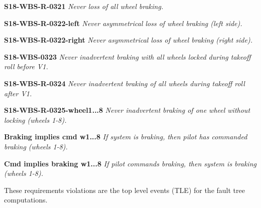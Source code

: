 \textbf{S18-WBS-R-0321} \textit{Never loss of all wheel braking.}

\textbf{S18-WBS-R-0322-left} \textit{Never asymmetrical loss of wheel braking (left side).}

\textbf{S18-WBS-R-0322-right} \textit{Never asymmetrical loss of wheel braking (right side).}

\textbf{S18-WBS-0323} \textit{Never inadvertent braking with all wheels locked during takeoff roll before V1.}

\textbf{S18-WBS-R-0324} \textit{Never inadvertent braking of all wheels during takeoff roll after V1.}

\textbf{S18-WBS-R-0325-wheel1...8} \textit{Never inadvertent braking of one wheel without locking (wheels 1-8).} 

\textbf{Braking implies cmd w1...8} \textit{If system is braking, then pilot has commanded braking (wheels 1-8).} 

\textbf{Cmd implies braking w1...8} \textit{If pilot commands braking, then system is braking (wheels 1-8).} 

These requirements violations are the top level events (TLE) for the fault tree computations. 

